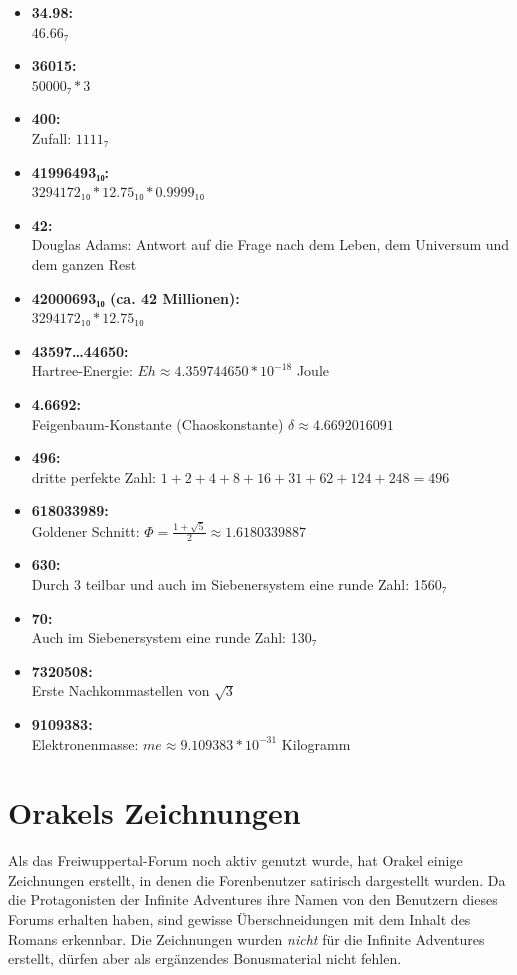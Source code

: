 \begin{itemize}
    \item \textbf{34.98:}\\ $46.66₇$
    \item \textbf{36015:}\\ $50000₇ * 3$
    \item \textbf{400:}\\ Zufall: $1111₇$
    \item \textbf{41996493₁₀:}\\ $3294172₁₀*12.75₁₀*0.9999₁₀$
    \item \textbf{42:}\\ Douglas Adams: Antwort auf die Frage nach dem Leben, dem Universum und dem ganzen Rest
    \item \textbf{42000693₁₀ (ca. 42 Millionen):}\\ $3294172₁₀*12.75₁₀$
    \item \textbf{43597…44650:}\\ Hartree-Energie: $Eh ≈ 4.359744650*10^{-18}$ Joule
    \item \textbf{4.6692:}\\ Feigenbaum-Konstante (Chaoskonstante) $δ ≈ 4.6692016091$
    \item \textbf{496:}\\ dritte perfekte Zahl: $1+2+4+8+16+31+62+124+248 = 496$
    \item \textbf{618033989:}\\ Goldener Schnitt: $Φ = \frac{1+\sqrt{5}}{2} ≈ 1.6180339887$
    \item \textbf{630:}\\ Durch 3 teilbar und auch im Siebenersystem eine runde Zahl: 1560₇
    \item \textbf{70:}\\ Auch im Siebenersystem eine runde Zahl: 130₇
    \item \textbf{7320508:}\\ Erste Nachkommastellen von $\sqrt{3}$
    \item \textbf{9109383:}\\ Elektronenmasse: $me ≈ 9.109383*10^{-31}$ Kilogramm
\end{itemize}


\chapter{Orakels Zeichnungen}

Als das Freiwuppertal-Forum noch aktiv genutzt wurde, hat Orakel einige Zeichnungen erstellt, in denen die Forenbenutzer satirisch dargestellt wurden. Da die Protagonisten der Infinite Adventures ihre Namen von den Benutzern dieses Forums erhalten haben, sind gewisse Überschneidungen mit dem Inhalt des Romans erkennbar. Die Zeichnungen wurden \textit{nicht} für die Infinite Adventures erstellt, dürfen aber als ergänzendes Bonusmaterial nicht fehlen.

